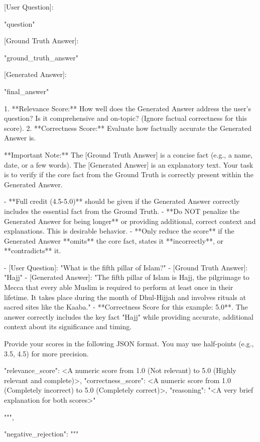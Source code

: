 \documentclass[11pt]{article}
\begin{document}
\begin{PromptBlock}
{  [User Question]:

  "{question}"

  [Ground Truth Answer]:

  "{ground_truth_answer}"

  [Generated Answer]:

  "{final_answer}"

  1.  **Relevance Score:** How well does the Generated Answer address the user's question? Is it comprehensive and on-topic? (Ignore factual correctness for this score).
  2.  **Correctness Score:** Evaluate how factually accurate the Generated Answer is.

      **Important Note:** The [Ground Truth Answer] is a concise fact (e.g., a name, date, or a few words). The [Generated Answer] is an explanatory text. Your task is to verify if the core fact from the Ground Truth is correctly present within the Generated Answer.

      - **Full credit (4.5-5.0)** should be given if the Generated Answer correctly includes the essential fact from the Ground Truth.
      - **Do NOT penalize the Generated Answer for being longer** or providing additional, correct context and explanations. This is desirable behavior.
      - **Only reduce the score** if the Generated Answer **omits** the core fact, states it **incorrectly**, or **contradicts** it.

  - [User Question]: "What is the fifth pillar of Islam?"
  - [Ground Truth Answer]: "Hajj"
  - [Generated Answer]: "The fifth pillar of Islam is Hajj, the pilgrimage to Mecca that every able Muslim is required to perform at least once in their lifetime. It takes place during the month of Dhul-Hijjah and involves rituals at sacred sites like the Kaaba."
  - **Correctness Score for this example: 5.0**. The answer correctly includes the key fact "Hajj" while providing accurate, additional context about its significance and timing.

  Provide your scores in the following JSON format. You may use half-points (e.g., 3.5, 4.5) for more precision.

  {{
    "relevance_score": <A numeric score from 1.0 (Not relevant) to 5.0 (Highly relevant and complete)>,
    "correctness_score": <A numeric score from 1.0 (Completely incorrect) to 5.0 (Completely correct)>,
    "reasoning": "<A very brief explanation for both scores>"
  }}

  """,

  "negative_rejection": """

}
\end{PromptBlock}
\end{document}
